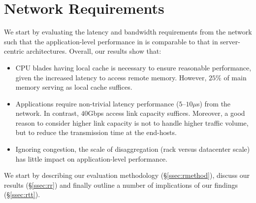 \section{\dis Network Requirements}
\label{sec:requirements}
We start by evaluating the latency and bandwidth requirements from the network such that the application-level performance in \dis is comparable to that in server-centric architectures. Overall, our results show that:

\begin{itemize}[leftmargin=*]
	\itemsep0em
	\item CPU blades having local cache is necessary to ensure reasonable performance, given the increased latency to access remote memory. However, $25\%$ of main memory serving as local cache suffices.
	\item Applications require non-trivial latency performance ($5$--$10\mu$s) from the network. In contrast, $40$Gbps access link capacity suffices. Moreover, a good reason to consider higher link capacity is not to handle higher traffic volume, but to reduce the transmission time at the end-hosts.  
    \item Ignoring congestion, the scale of disaggregation (rack versus datacenter scale) has little impact on application-level performance. 
\end{itemize}

\noindent
We start by describing our evaluation methodology (\S\ref{ssec:rmethod}), discuss our results (\S\ref{ssec:rr}) and finally outline a number of implications of our findings (\S\ref{ssec:rtt}). 

%
\begin{figure}

  \centering
  \caption{\small{}}
  \label{fig:latb}
\end{figure}
%
